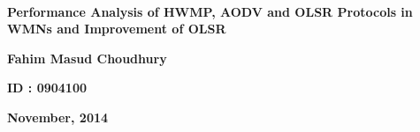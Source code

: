 \ \newline

\vspace{60mm}

\begin{center}
\textbf{{\large Performance Analysis of HWMP, AODV and OLSR Protocols in WMNs and Improvement of OLSR} }
\end{center}

\vspace{25mm}
\begin{center}
\textbf{{\large Fahim Masud Choudhury}}
\

\textbf{{\large ID : 0904100}}
\end{center}

\vspace{40mm}
\begin{center}
\textbf{{\large November, 2014}}
\end{center}


